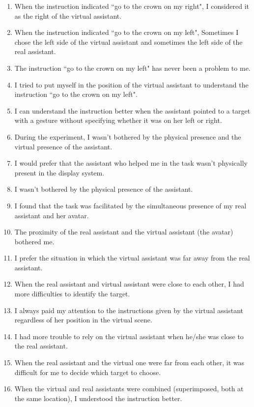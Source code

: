 \begin{appendices}
\begin{enumerate}
	\item When the instruction indicated ``go to the crown on my right", I considered it as the right of the virtual assistant.
	\item When the instruction indicated ``go to the crown on my left", Sometimes I chose the left side of the virtual assistant and sometimes the left side of the real assistant.
	\item The instruction ``go to the crown on my left" has never been a problem to me.
	\item I tried to put myself in the position of the virtual assistant to understand the instruction ``go to the crown on my left".
	\item I can understand the instruction better when the assistant pointed to a target with a gesture without specifying whether it was on her left or right.
	\item During the experiment, I wasn't bothered by the physical presence and the virtual presence of the assistant.
	\item I would prefer that the assistant who helped me in the task wasn't physically present in the display system.
	\item I wasn't bothered by the physical presence of the assistant.
	\item I found that the task was facilitated by the simultaneous presence of my real assistant and her avatar.
	\item The proximity of the real assistant and the virtual assistant (the avatar) bothered me.
	\item I prefer the situation in which the virtual assistant was far away from the real assistant.
	\item When the real assistant and virtual assistant were close to each other, I had more difficulties to identify the target.
	\item I always paid my attention to the instructions given by the virtual assistant regardless of her position in the virtual scene.
	\item I had more trouble to rely on the virtual assistant when he/she was close to the real assistant.
	\item When the real assistant and the virtual one were far from each other, it was difficult for me to decide which target to choose.
	\item When the virtual and real assistants were combined (superimposed, both at the same location), I understood the instruction better.
\end{enumerate}


\end{appendices}
